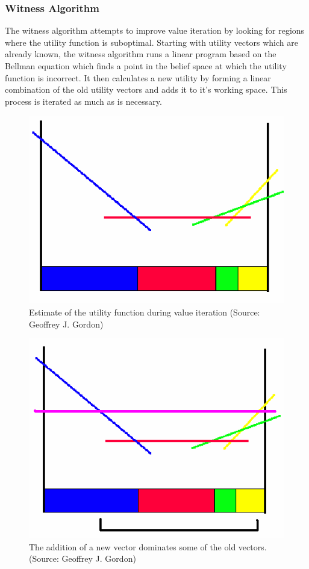 \documentclass[tog]{acmsiggraph}
\begin{document}
\subsubsection{Witness Algorithm}
The witness algorithm attempts to improve value iteration by looking for regions where the utility function is suboptimal. Starting with utility vectors which are already known, the witness algorithm runs a linear program based on the Bellman equation which finds a point in the belief space at which the utility function is incorrect. It then calculates a new utility by forming a linear combination of the old utility vectors and adds it to it's working space. This process is iterated as much as is necessary.
\begin{figure}[h]
  \centering
  \includegraphics[scale=0.3]{currentValueEstimate.png}
  \caption{Estimate of the utility function during value iteration (Source: Geoffrey J. Gordon)}
  \label{fig:current}
\end{figure}

\begin{figure}[h]
  \centering
  \includegraphics[scale=0.3]{suboptimalWitness.png}
  \caption{The addition of a new vector dominates some of the old vectors. (Source: Geoffrey J. Gordon)}
  \label{fig:current}
\end{figure}
\end{document}
